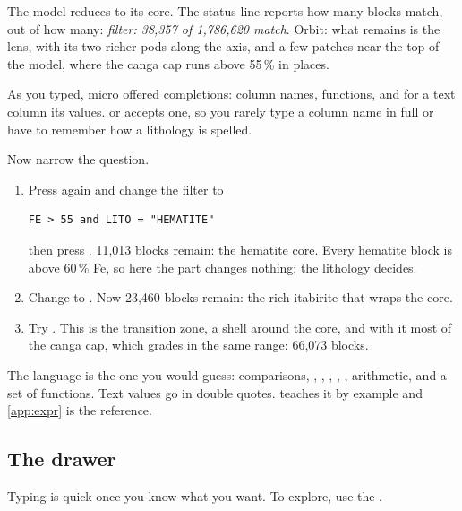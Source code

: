 The model reduces to its core. The status line reports how many blocks match, out of how many: \emph{filter: 38,357 of 1,786,620 match}. Orbit: what remains is the lens, with its two richer pods along the axis, and a few patches near the top of the model, where the canga cap runs above 55\,\% in places.


As you typed, micro offered completions: column names, functions, and for a text column its values.  or  accepts one, so you rarely type a column name in full or have to remember how a lithology is spelled.

Now narrow the question.

\begin{tryit}
\begin{enumerate}
\item Press \key{/} again and change the filter to
\begin{lstlisting}[language=expr]
FE > 55 and LITO = "HEMATITE"
\end{lstlisting}
then press . 11,013 blocks remain: the hematite core. Every hematite block is above 60\,\% Fe, so here the  part changes nothing; the lithology decides.
\item Change  to . Now 23,460 blocks remain: the rich itabirite that wraps the core.
\item Try . This is the transition zone, a shell around the core, and with it most of the canga cap, which grades in the same range: 66,073 blocks.
\end{enumerate}
\end{tryit}

The language is the one you would guess: comparisons, , , , , , arithmetic, and a set of functions. Text values go in double quotes.  teaches it by example and \cref{app:expr} is the reference.

\subsection{The drawer}
Typing is quick once you know what you want. To explore, use the .

